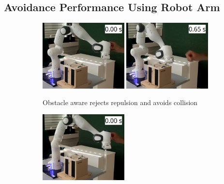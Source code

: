 \subsection{Avoidance Performance Using Robot Arm}
\begin{figure}
    \centering
   \begin{subfigure}{\columnwidth}
    \includegraphics[width=0.49\textwidth]{figures/franka_sequence/franka_obstacle_aware016}\hfill%
    \includegraphics[width=0.49\textwidth]{figures/franka_sequence/franka_obstacle_aware020}
      \caption{Obstacle aware rejects repulsion and avoids collision}
      \label{fig:franka_sequence_obstacle_aware}
    \end{subfigure}
	\begin{subfigure}{\columnwidth}
    \includegraphics[width=0.49\textwidth]{figures/franka_sequence/franka_velocity_conserving021}\hfill%

\end{subfigure}
\end{figure}
